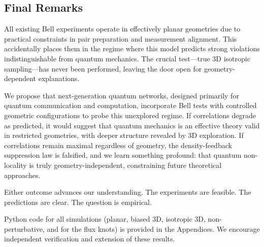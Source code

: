 \documentclass[11pt,a4paper]{article}
\theoremstyle{definition}
\theoremstyle{remark}
\begin{document}
\subsection{Final Remarks}

All existing Bell experiments operate in effectively planar geometries due to practical constraints in pair preparation and measurement alignment. This accidentally places them in the regime where this model predicts strong violations indistinguishable from quantum mechanics. The crucial test---true 3D isotropic sampling---has never been performed, leaving the door open for geometry-dependent explanations.

We propose that next-generation quantum networks, designed primarily for quantum communication and computation, incorporate Bell tests with controlled geometric configurations to probe this unexplored regime. If correlations degrade as predicted, it would suggest that quantum mechanics is an effective theory valid in restricted geometries, with deeper structure revealed by 3D exploration. If correlations remain maximal regardless of geometry, the density-feedback suppression law is falsified, and we learn something profound: that quantum non-locality is truly geometry-independent, constraining future theoretical approaches.

Either outcome advances our understanding. The experiments are feasible. The predictions are clear. The question is empirical.

Python code for all simulations (planar, biased 3D, isotropic 3D, non-perturbative, and for the flux knots) is provided in the Appendices. We encourage independent verification and extension of these results.
\end{document}

